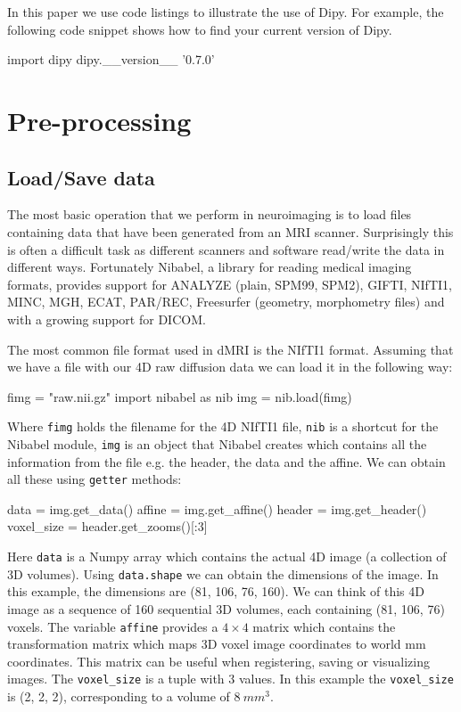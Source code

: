 \documentclass{bioinfo}
\begin{document}
In this paper we use code listings to illustrate the use of Dipy. For
example, the following code snippet shows how to find your current version of
Dipy.
\begin{python}
import dipy
dipy.__version__
'0.7.0'
\end{python}

\section{Pre-processing}\label{preprocessing}

\subsection{Load/Save data}\label{loadsave}
The most basic operation that we perform in neuroimaging is to load files
containing data that have been generated from an MRI scanner. Surprisingly this
is often a difficult task as different scanners and software read/write the data
in different ways.  Fortunately Nibabel, a library for reading medical imaging
formats, provides support for ANALYZE (plain, SPM99, SPM2), GIFTI, NIfTI1, MINC,
MGH, ECAT, PAR/REC, Freesurfer (geometry, morphometry files) and with a growing
support for DICOM.

The most common file format used in dMRI is the NIfTI1 format. Assuming that we have a
file with our 4D raw diffusion data we can load it in the following way:
\begin{python}
fimg = "raw.nii.gz"
import nibabel as nib
img = nib.load(fimg)
\end{python}
Where \texttt{fimg} holds the filename for the 4D NIfTI1 file, \texttt{nib} is
a shortcut for the Nibabel module, \texttt{img} is an object that Nibabel
creates which contains all the information from the file e.g. the header, the
data and the affine. We can obtain all these using \texttt{getter} methods:
\begin{python}
data = img.get_data()
affine = img.get_affine()
header = img.get_header()
voxel_size = header.get_zooms()[:3]
\end{python}
Here \texttt{data} is a Numpy array which contains the actual 4D image (a
collection of 3D volumes). Using \texttt{data.shape} we can obtain the
dimensions of the image. In this example, the dimensions are (81, 106, 76,
160).  We can think of this 4D image as a sequence of 160 sequential 3D volumes,
each containing (81, 106, 76) voxels.  The variable \texttt{affine} provides a
$4\times4$ matrix which contains the transformation matrix which maps 3D voxel
image coordinates to world mm coordinates. This matrix can be useful when
registering, saving or visualizing images. The \texttt{voxel\_size} is a tuple
with 3 values. In this example the \texttt{voxel\_size} is (2, 2, 2),
corresponding to a volume of $8~mm^3$.
\end{document}
